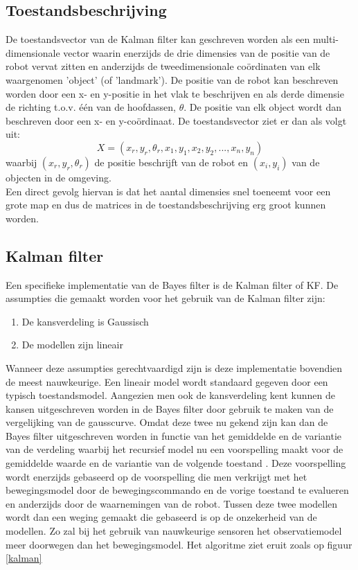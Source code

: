 \documentclass{book}
\begin{document}
\subsection{Toestandsbeschrijving}\label{beschrijving}
De toestandsvector van de Kalman filter kan geschreven worden als een multi-dimensionale vector waarin enerzijds de drie dimensies van de positie van de robot vervat zitten en anderzijds de tweedimensionale coördinaten van elk waargenomen 'object' (of 'landmark'). De positie van de robot kan beschreven worden door een x- en y-positie in het vlak te beschrijven en als derde dimensie de richting t.o.v. één van de hoofdassen, $\theta$. De positie van elk object wordt dan beschreven door een x- en y-coördinaat. De toestandsvector ziet er dan als volgt uit:
\begin{equation}
X = (x_r,y_r,\theta_r,x_1,y_1,x_2,y_2,...,x_n,y_n)
\end{equation}
waarbij $(x_r,y_r,\theta_r)$ de positie beschrijft van de robot en $(x_i,y_i)$ van de objecten in de omgeving.\\
Een direct gevolg hiervan is dat het aantal dimensies snel toeneemt voor een grote map en dus de matrices in de toestandsbeschrijving erg groot kunnen worden. 
\subsection{Kalman filter}
Een specifieke implementatie van de Bayes filter is de Kalman filter of KF. De assumpties die gemaakt worden voor het gebruik van de Kalman filter zijn:
\begin{enumerate}
	\item De kansverdeling is Gaussisch
	\item De modellen zijn lineair
\end{enumerate}
Wanneer deze assumpties gerechtvaardigd zijn is deze implementatie bovendien de meest nauwkeurige.
Een lineair model wordt standaard gegeven door een typisch toestandsmodel. %
Aangezien men ook de kansverdeling kent kunnen de kansen uitgeschreven worden in de Bayes filter door gebruik te maken van de vergelijking van de gausscurve. Omdat deze twee nu gekend zijn kan dan de Bayes filter uitgeschreven worden in functie van het gemiddelde en de variantie van de verdeling waarbij het recursief model nu een voorspelling maakt voor de gemiddelde waarde en de variantie van de volgende toestand \cite{kalman}. Deze voorspelling wordt enerzijds gebaseerd op de voorspelling die men verkrijgt met het bewegingsmodel door de bewegingscommando en de vorige toestand te evalueren en anderzijds door de waarnemingen van de robot. Tussen deze twee modellen wordt dan een weging gemaakt die gebaseerd is op de onzekerheid van de modellen. Zo zal bij het gebruik van nauwkeurige sensoren het observatiemodel meer doorwegen dan het bewegingsmodel. Het algoritme ziet eruit zoals op figuur \ref{kalman}
\end{document}
